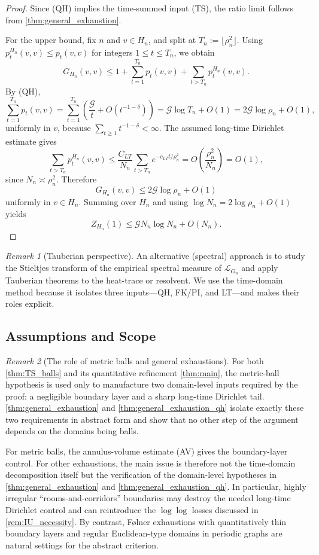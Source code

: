 \documentclass[reqno]{amsart}
\numberwithin{equation}{section}
\theoremstyle{definition}
\theoremstyle{remark}
\newtheorem{remark}[remark]{Remark}
\newcommand{\Cref}[1]{\autoref{#1}}
\newcommand{\cG}{\mathcal{G}}
\newcommand{\LL}{\mathcal{L}}
\begin{document}
\begin{proof}
Since \textup{(QH)} implies the time-summed input \textup{(TS)}, the ratio limit follows from \Cref{thm:general_exhaustion}.

For the upper bound, fix $n$ and $v\in H_n$, and split at $T_n:=\lfloor \rho_n^2\rfloor$. Using $p_t^{H_n}(v,v)\le p_t(v,v)$ for integers $1\le t\le T_n$, we obtain
\[
  G_{H_n}(v,v)\le 1+\sum_{t=1}^{T_n} p_t(v,v)+\sum_{t>T_n} p_t^{H_n}(v,v).
\]
By \textup{(QH)},
\[
\sum_{t=1}^{T_n} p_t(v,v)
= \sum_{t=1}^{T_n}\left(\frac{\cG}{t}+O(t^{-1-\delta})\right)
= \cG\log T_n + O(1)
= 2\cG\log \rho_n + O(1),
\]
uniformly in $v$, because $\sum_{t\ge1} t^{-1-\delta}<\infty$. The assumed long-time Dirichlet estimate gives
\[
  \sum_{t>T_n} p_t^{H_n}(v,v)
  \le \frac{C_{LT}}{N_n}\sum_{t>T_n} e^{-c_{LT}t/\rho_n^2}
  = O\!\left(\frac{\rho_n^2}{N_n}\right)
  = O(1),
\]
since $N_n\asymp \rho_n^2$. Therefore
\[
  G_{H_n}(v,v)\le 2\cG\log \rho_n + O(1)
\]
uniformly in $v\in H_n$. Summing over $H_n$ and using $\log N_n = 2\log \rho_n + O(1)$ yields
\[
  Z_{H_n}(1)\le \cG N_n\log N_n + O(N_n).
\]
\end{proof}

\begin{remark}[Tauberian perspective]
An alternative (spectral) approach is to study the Stieltjes transform of the empirical spectral measure of $\LL_{G_n}$ and apply Tauberian theorems to the heat-trace or resolvent. We use the time-domain method because it isolates three inputs---QH, FK/PI, and LT---and makes their roles explicit.
\end{remark}

\subsection{Assumptions and Scope}


\begin{remark}[The role of metric balls and general exhaustions]\label{rem:general_exhaustions}
For both \Cref{thm:TS_balls} and its quantitative refinement \Cref{thm:main}, the metric-ball hypothesis is used only to manufacture two domain-level inputs required by the proof: a negligible boundary layer and a sharp long-time Dirichlet tail. \Cref{thm:general_exhaustion} and \Cref{thm:general_exhaustion_qh} isolate exactly these two requirements in abstract form and show that no other step of the argument depends on the domains being balls.

For metric balls, the annulus-volume estimate (AV) gives the boundary-layer control. For other exhaustions, the main issue is therefore not the time-domain decomposition itself but the verification of the domain-level hypotheses in \Cref{thm:general_exhaustion} and \Cref{thm:general_exhaustion_qh}. In particular, highly irregular ``rooms-and-corridors'' boundaries may destroy the needed long-time Dirichlet control and can reintroduce the $\log\log$ losses discussed in \Cref{rem:IU_necessity}. By contrast, Følner exhaustions with quantitatively thin boundary layers and regular Euclidean-type domains in periodic graphs are natural settings for the abstract criterion.
\end{remark}
\end{document}
